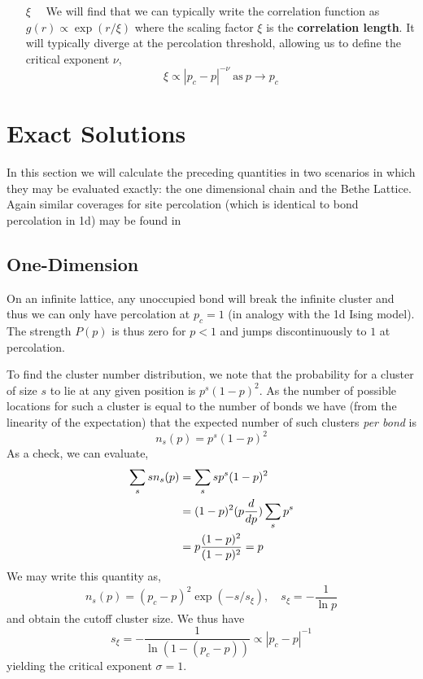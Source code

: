 \begin{enumerate}
\item[$\xi\quad$] We will find that we can typically write the correlation function as
\(g(r) \propto \exp{(r/\xi)}\) where the scaling factor $\xi$ is the
\textbf{correlation length}. It will typically diverge at the percolation threshold,
allowing us to define the critical exponent $\nu$,
\[ \xi \propto |p_c - p|^{-\nu} \ \text{as}\ p\to p_c \]
\end{enumerate}


\section{Exact Solutions}

In this section we will calculate the preceding quantities in two scenarios in which they
may be evaluated exactly: the one dimensional chain and the Bethe Lattice.  Again
similar coverages for site percolation (which is identical to bond percolation in 1d)
may be found in \cite{Stauffer1994} \cite{Christensen2002}

\subsection{One-Dimension}

On an infinite lattice, any unoccupied bond will break the infinite cluster and thus
we can only have percolation at $p_c = 1$ (in analogy with the 1d Ising model).  The
strength $P(p)$ is thus zero for $p<1$ and jumps discontinuously to $1$ at percolation.

To find the cluster number distribution, we note that the probability for a cluster
of size $s$ to lie at any given position is $p^s(1-p)^2$.  As the number of possible
locations for such a cluster is equal to the number of bonds we have (from the linearity
of the expectation) that the expected number of such clusters \emph{per bond} is
\[n_s(p) = p^s(1-p)^2\]
As a check, we can evaluate,
\begin{align*}
\sum_s sn_s(p) &= \sum_s sp^s(1-p)^2 \\
 &= (1-p)^2 (p\frac{d }{d p})\sum_s p^s \\
 &= p\frac{(1-p)^2}{(1-p)^2} = p
\end{align*}
We may write this
quantity as,
\[n_s(p) = (p_c - p)^2\exp{(-s/s_\xi)}, \quad s_\xi = -\frac{1}{\ln{p}}\]
and obtain the cutoff cluster size.  We thus have
\[s_\xi = -\frac{1}{\ln(1 - (p_c - p))}\propto |p_c - p|^{-1}\]
yielding the critical exponent $\sigma=1$.


